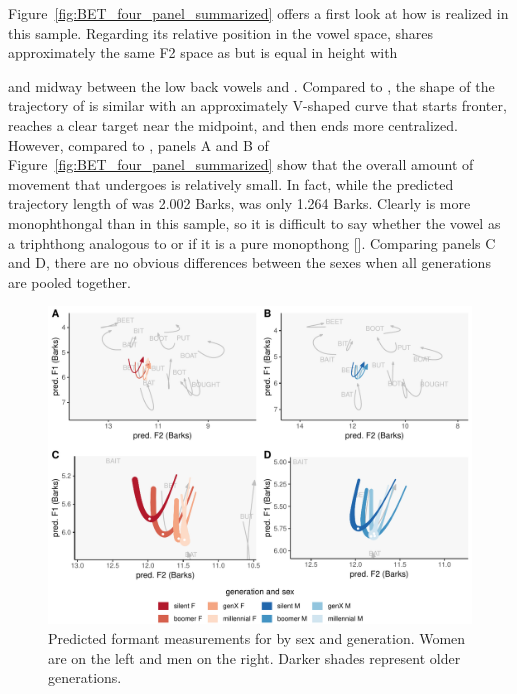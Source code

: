 Figure~\ref{fig:BET_four_panel_summarized} offers a first look at how \bet is realized in this sample. Regarding its relative position in the vowel space, \bet shares approximately the same F2 space as \bat but is equal in height with \strut and midway between the low back vowels and \goat. Compared to \bat, the shape of the trajectory of \bet is similar with an approximately V-shaped curve that starts fronter, reaches a clear target near the midpoint, and then ends more centralized. However, compared to \bat, panels A and B of Figure~\ref{fig:BET_four_panel_summarized} show that the overall amount of movement that \bet undergoes is relatively small. In fact, while the predicted trajectory length of \bat was 2.002 Barks, \bet was only 1.264 Barks. Clearly \bet is more monophthongal than \bat in this sample, so it is difficult to say whether the vowel as a triphthong analogous to  or if it is a pure monopthong []. Comparing panels C and D, there are no obvious differences between the sexes when all generations are pooled together.

\begin{figure}[tb!]
	\centering
	\includegraphics[width = 6.5in]{Figures/BET/BET_four_panel_plot.pdf}
	\caption[Predicted formant measurements for \bet by sex and generation.]{Predicted formant measurements for \bet by sex and generation. Women are on the left and men on the right. Darker shades represent older generations.}
	\label{fig:BET_four_panel}
\end{figure}

